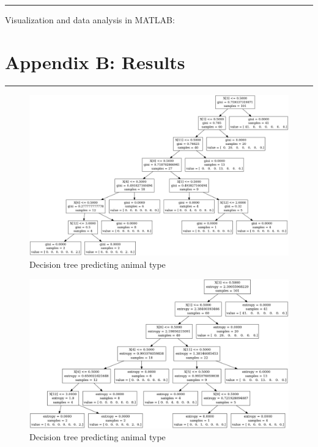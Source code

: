 \documentclass[	DIV=calc,%
				paper=a4,%
				fontsize=11pt,%
				twocolumn]{scrartcl}	 %
\newcommand{\HorRule}{\color{brsublue}%
					 \rule{\linewidth}{1pt}%
					 \color{black}
					 }
\begin{document}
\HorRule

Visualization and data analysis in MATLAB:



\newpage


\section*{Appendix B: Results}

\HorRule

\begin{figure}[h]
  \centering
  \caption{Decision tree predicting animal type}
  \label{7-1-gini}
  \includegraphics[width=1\textwidth]{./img/7-1-gini.jpg}
\end{figure}

\begin{figure}[h]
  \centering
  \caption{Decision tree predicting animal type}
  \label{7-1-entropy}
  \includegraphics[width=1\textwidth]{./img/7-1-entropy.jpg}
\end{figure}
\end{document}
